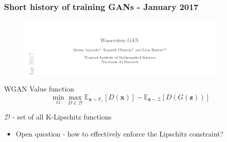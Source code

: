 \documentclass{Bredelebeamer}
\begin{document}

\begin{frame}
	\frametitle{Short history of training GANs - January 2017}
	\begin{figure}[h!]
		\centering
		\includegraphics[width=0.9\textwidth]{wgan_paper.png}
	\end{figure}
	\begin{exampleblock}{WGAN Value function}
	\[
		\min_G \max_{D \in \mathcal{D}} \mathbb{E}_{\bm{x} \sim \mathbb{P}_r} \left[ D(\bm{x}) \right] - \mathbb{E}_{\bm{z} \sim \mathcal{Z}} \left[ D(G(\bm{z}))  \right]
	\]
	\begin{center}
		$\mathcal{D}$ - set of all K-Lipschitz functions
	\end{center}
	\end{exampleblock}
	\pause
	\begin{itemize}
		\item Open question - how to effectively enforce the Lipschitz constraint?
	\end{itemize}
\end{frame}
\end{document}
